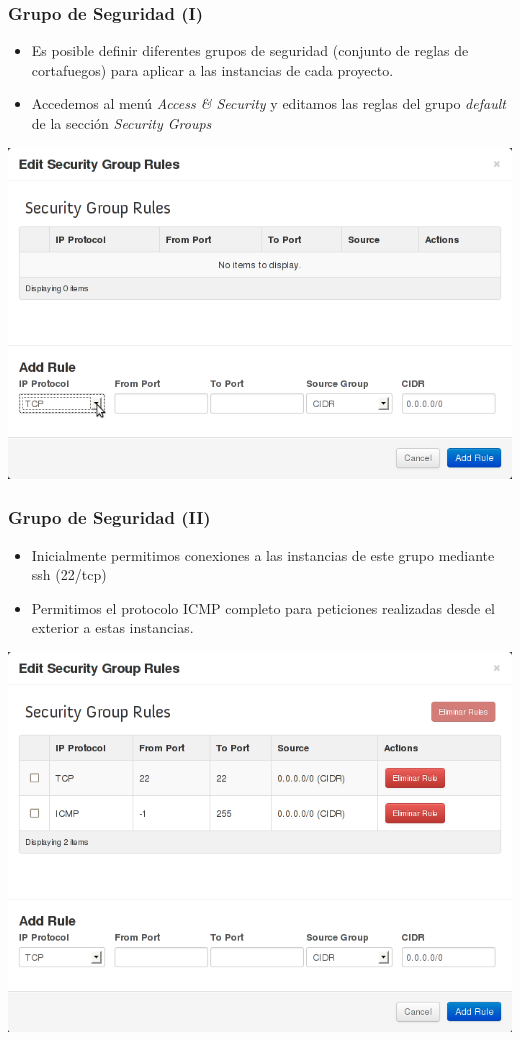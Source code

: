 \documentclass{beamer}
\begin{document}
\begin{frame}
  \frametitle{Grupo de Seguridad (I)}
  \begin{itemize}
  \item Es posible definir diferentes grupos de seguridad (conjunto de reglas de
    cortafuegos) para aplicar a las instancias de cada proyecto.
  \item Accedemos al menú \textit{Access \& Security} y editamos las reglas del
    grupo \textit{default} de la sección \textit{Security Groups}
  \end{itemize}
  \begin{center}
    \includegraphics[width=.5\textwidth]{../img/horizon3.png}    
  \end{center}

\end{frame}

\begin{frame}
  \frametitle{Grupo de Seguridad (II)}
  \begin{itemize}
  \item Inicialmente permitimos conexiones a las instancias de este grupo
    mediante ssh (22/tcp)
  \item Permitimos el protocolo ICMP completo para peticiones realizadas desde
    el exterior a estas instancias.
  \end{itemize}
  \begin{center}
    \includegraphics[width=.5\textwidth]{../img/horizon4.png}  
  \end{center}
\end{frame}
\end{document}
